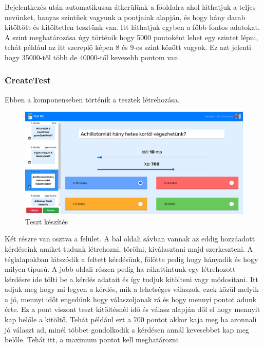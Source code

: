 Bejelentkezés után automatikusan átkerülünk a főoldalra ahol láthatjuk a teljes nevünket, hanyas szintűek vagyunk a pontjaink alapján, és hogy hány darab kitöltött és kitöltetlen tesztünk van. Itt láthatjuk egyben a főbb fontos adatokat. A szint meghatározása úgy történik hogy 5000 pontoként lehet egy szintet lépni, tehát például az itt szereplő képen 8 és 9-es szint között vagyok. Ez azt jelenti hogy 35000-től több de 40000-től kevesebb pontom van.

\subsubsection{CreateTest}

Ebben a komponenseben történik a tesztek létrehozása.

\begin{figure}[H]
    \centering
    \includegraphics[width=\linewidth]{images/make_test1.png}
    \caption{Teszt készítés}
\end{figure}

Két részre van osztva a felület. A bal oldali sávban vannak az eddig hozzáadott kérdéseink amiket tudunk létrehozni, törölni, kiválasztani majd szerkeszteni. A téglalapokban látszódik a feltett kérdésünk, fölötte pedig hogy hányadik és hogy milyen típusú. A jobb oldali részen pedig ha rákattintunk egy létrehozott kérdésre ide tölti be a kérdés adatait és így tudjuk kitölteni vagy módosítani. Itt adjuk meg hogy mi legyen a kérdés, mik a lehetséges válaszok, ezek közül melyik a jó, mennyi időt engedünk hogy válaszoljanak rá és hogy mennyi pontot adunk érte. Ez a pont viszont teszt kitöltésnél idő és válasz alapján dől el hogy mennyit kap belőle a kitöltő. Tehát például ezt a 700 pontot akkor kaja meg ha azonnali jó választ ad, minél többet gondolkodik a kérdésen annál kevesebbet kap meg belőle. Tehát itt, a maximum pontot kell meghatározni.

